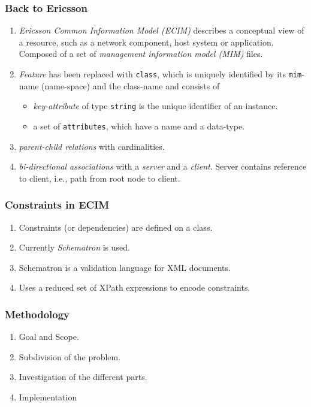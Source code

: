 \documentclass[swedish]{beamer}
\begin{document}
 \begin{frame}
 \frametitle{Back to Ericsson}
 \begin{enumerate}
  \item \emph{Ericsson Common Information Model (ECIM)} describes a conceptual view of a resource, such as a network component, host system or application. Composed of a set of \emph{management information model (MIM)} files.
  
  \item \emph{Feature} has been replaced with \texttt{class}, which is uniquely identified by its \texttt{mim}-name (name-space) and the class-name and consists of 
   \begin{itemize}
    \item \emph{key-attribute} of type \texttt{string} is the unique identifier of an instance.
    \item a set of \texttt{attributes}, which have a name and a data-type.
   \end{itemize}
  
  \item \emph{parent-child relations} with cardinalities.
  
  \item \emph{bi-directional associations} with a \emph{server} and a \emph{client}. Server contains reference to client, i.e., path from root node to client. 
 \end{enumerate}
 \end{frame}
 
 \begin{frame}
  \frametitle{Constraints in ECIM}
  \begin{enumerate}
   \item Constraints (or dependencies) are defined on a class.
   \item Currently \emph{Schematron} is used.
   \item Schematron is a validation language for XML documents. 
   \item Uses a reduced set of XPath expressions to encode constraints.
  \end{enumerate}
 \end{frame}
 
 \begin{frame}
 \frametitle{Methodology}
 \begin{enumerate}
  \item Goal and Scope.
  \item Subdivision of the problem.
  \item Investigation of the different parts.
  \item Implementation
 \end{enumerate} 
 \end{frame}
 
\end{document}
